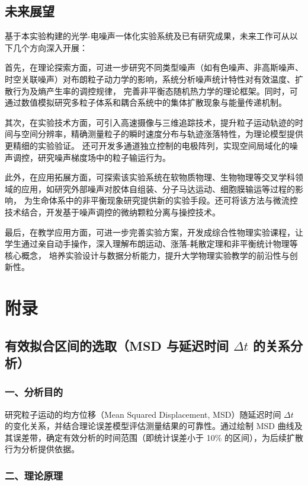 \documentclass[a4paper]{report} %
\begin{document}
\section{未来展望}
基于本实验构建的光学-电噪声一体化实验系统及已有研究成果，未来工作可从以下几个方向深入开展：

首先，在理论探索方面，可进一步研究不同类型噪声（如有色噪声、非高斯噪声、时空关联噪声）对布朗粒子动力学的影响，系统分析噪声统计特性对有效温度、扩散行为及熵产生率的调控规律，
完善非平衡态随机热力学的理论框架。同时，可通过数值模拟研究多粒子体系和耦合系统中的集体扩散现象与能量传递机制。

其次，在实验技术方面，可引入高速摄像与三维追踪技术，提升粒子运动轨迹的时间与空间分辨率，精确测量粒子的瞬时速度分布与轨迹涨落特性，为理论模型提供更精细的实验验证。
还可开发多通道独立控制的电极阵列，实现空间局域化的噪声调控，研究噪声梯度场中的粒子输运行为。

此外，在应用拓展方面，可探索该实验系统在软物质物理、生物物理等交叉学科领域的应用，如研究外部噪声对胶体自组装、分子马达运动、细胞膜输运等过程的影响，
为生命体系中的非平衡现象研究提供新的实验手段。还可将该方法与微流控技术结合，开发基于噪声调控的微纳颗粒分离与操控技术。

最后，在教学应用方面，可进一步完善实验方案，开发成综合性物理实验课程，让学生通过亲自动手操作，深入理解布朗运动、涨落-耗散定理和非平衡统计物理等核心概念，
培养实验设计与数据分析能力，提升大学物理实验教学的前沿性与创新性。

\chapter{附录}
\section{有效拟合区间的选取（MSD 与延迟时间 $\Delta t$ 的关系分析）}
\subsection*{一、分析目的}

研究粒子运动的均方位移（Mean Squared Displacement, MSD）随延迟时间 $\Delta t$ 的变化关系，并结合理论误差模型评估测量结果的可靠性。通过绘制 MSD 曲线及其误差带，确定有效分析的时间范围（即统计误差小于 10\% 的区间），为后续扩散行为分析提供依据。

\subsection*{二、理论原理}
\end{document}

